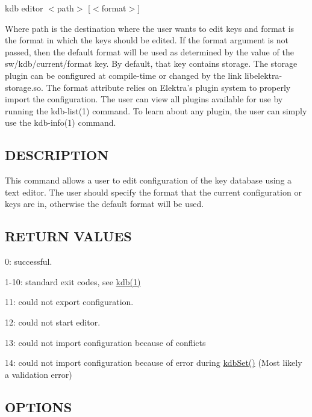 {\ttfamily kdb editor $<$path$>$ \mbox{[}$<$format$>$\mbox{]}}

Where {\ttfamily path} is the destination where the user wants to edit keys and {\ttfamily format} is the format in which the keys should be edited. If the {\ttfamily format} argument is not passed, then the default format will be used as determined by the value of the {\ttfamily sw/kdb/current/format} key. By default, that key contains {\ttfamily storage}. The {\ttfamily storage} plugin can be configured at compile-\/time or changed by the link {\ttfamily libelektra-\/storage.\+so}. The {\ttfamily format} attribute relies on Elektra’s plugin system to properly import the configuration. The user can view all plugins available for use by running the kdb-\/list(1) command. To learn about any plugin, the user can simply use the kdb-\/info(1) command.

\subsection*{D\+E\+S\+C\+R\+I\+P\+T\+I\+ON}

This command allows a user to edit configuration of the key database using a text editor. The user should specify the format that the current configuration or keys are in, otherwise the default format will be used.

\subsection*{R\+E\+T\+U\+RN V\+A\+L\+U\+ES}


\begin{DoxyItemize}
\item 0\+: successful.
\item 1-\/10\+: standard exit codes, see \hyperlink{md_doc_help_kdb_doc_help_kdb_md}{kdb(1)}
\item 11\+: could not export configuration.
\item 12\+: could not start editor.
\item 13\+: could not import configuration because of conflicts
\item 14\+: could not import configuration because of error during \hyperlink{group__kdb_ga11436b058408f83d303ca5e996832bcf}{kdb\+Set()} (Most likely a validation error)
\end{DoxyItemize}

\subsection*{O\+P\+T\+I\+O\+NS}


